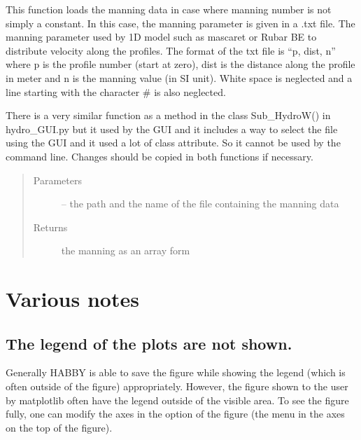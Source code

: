 \documentclass[letterpaper,10pt,english]{sphinxmanual}
\begin{document}
\begin{fulllineitems}
\label{\detokenize{index:src.func_for_cmd.load_manning_txt}}
This function loads the manning data in case where manning number is not simply a constant. In this case, the manning
parameter is given in a .txt file. The manning parameter used by 1D model such as mascaret or Rubar BE to distribute
velocity along the profiles. The format of the txt file is ``p, dist, n'' where  p is the profile number (start at zero),
dist is the distance along the profile in meter and n is the manning value (in SI unit). White space is neglected
and a line starting with the character \# is also neglected.

There is a very similar function as a method in the class Sub\_HydroW() in hydro\_GUI.py but it used by the GUI
and it includes a way to select the file using the GUI and it used a lot of class attribute. So it cannot be used
by the command line. Changes should be copied in both functions if necessary.
\begin{quote}\begin{description}
\item[{Parameters}] \leavevmode
{} -- the path and the name of the file containing the manning data

\item[{Returns}] \leavevmode
the manning as an array form

\end{description}\end{quote}

\end{fulllineitems}



\chapter{Various notes}
\label{\detokenize{index:various-notes}}

\section{The legend of the plots are not shown.}
\label{\detokenize{index:the-legend-of-the-plots-are-not-shown}}
Generally HABBY is able to save the figure while showing the legend (which is often outside of the figure) appropriately. However,
the figure shown to the user by matplotlib often have the legend outside of the visible area. To see the figure fully, one can modify
the axes in the option of the figure (the menu in the axes on the top of the figure).
\end{document}
